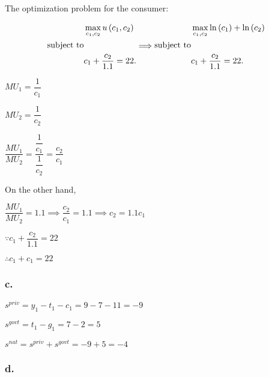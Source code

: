 \documentclass{article}
\begin{document}
The optimization problem for the consumer:

\begin{equation*}
    \begin{aligned}
    & \max_{c_{1},c_{2}}
      u\left(c_{1},c_{2}\right) \\
     \text{subject to}\\
    &   c_{1}+\dfrac{c_{2}}{1.1}=22.
    \end{aligned}\\
    \Longrightarrow
    \begin{aligned}
    & \max_{c_{1},c_{2}}
      \ln\left(c_{1}\right)+\ln\left(c_{2}\right) \\
      \text{subject to}\\
    &  c_{1}+\dfrac{c_{2}}{1.1}=22.
    \end{aligned}
\end{equation*}

$MU_{1}=\dfrac{1}{c_{1}}$

$MU_{2}=\dfrac{1}{c_{2}}$

$\dfrac{MU_{1}}{MU_{2}}=\dfrac{\dfrac{1}{c_{1}}}{\dfrac{1}{c_{2}}}=\dfrac{c_{2}}{c_{1}}$

On the other hand, 

$\dfrac{MU_{1}}{MU_{2}}=1.1\implies \dfrac{c_{2}}{c_{1}}=1.1 \implies c_{2}=1.1c_{1}$

$\because c_{1}+\dfrac{c_{2}}{1.1}=22$

$\therefore c_{1}+c_{1}=22$

\begin{spacing}{1}
\end{spacing}

\subsubsection*{\textrm{c.}}

$s^{priv}=y_{1}-t_{1}-c_{1}=9-7-11=\boxed{-9}$

$s^{govt}=t_{1}-g_{1}=7-2=\boxed{5}$

$s^{nat}=s^{priv}+s^{govt}=-9+5=\boxed{-4}$

\subsubsection*{\textrm{d.}}
\end{document}
